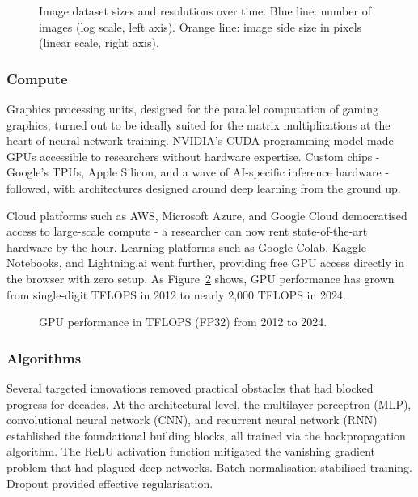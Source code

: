 \begin{figure}[h]
    \centering
    
    \caption{Image dataset sizes and resolutions over time. Blue line: number of images (log scale, left axis). Orange line: image side size in pixels (linear scale, right axis).}
    \label{fig:dataset_scale}
\end{figure}

\subsubsection{Compute}

Graphics processing units, designed for the parallel computation of gaming graphics, turned out to be ideally suited for the matrix multiplications at the heart of neural network training. NVIDIA's CUDA programming model made GPUs accessible to researchers without hardware expertise. Custom chips - Google's TPUs, Apple Silicon, and a wave of AI-specific inference hardware - followed, with architectures designed around deep learning from the ground up.

Cloud platforms such as AWS, Microsoft Azure, and Google Cloud democratised access to large-scale compute - a researcher can now rent state-of-the-art hardware by the hour. Learning platforms such as Google Colab, Kaggle Notebooks, and Lightning.ai went further, providing free GPU access directly in the browser with zero setup. As Figure~\ref{fig:gpu_performance} shows, GPU performance has grown from single-digit TFLOPS in 2012 to nearly 2,000 TFLOPS in 2024.

\begin{figure}[h]
    \centering
    
    \caption{GPU performance in TFLOPS (FP32) from 2012 to 2024.}
    \label{fig:gpu_performance}
\end{figure}

\subsubsection{Algorithms}

Several targeted innovations removed practical obstacles that had blocked progress for decades. At the architectural level, the multilayer perceptron (MLP), convolutional neural network (CNN), and recurrent neural network (RNN) established the foundational building blocks, all trained via the backpropagation algorithm. The ReLU activation function mitigated the vanishing gradient problem that had plagued deep networks. Batch normalisation stabilised training. Dropout provided effective regularisation.

